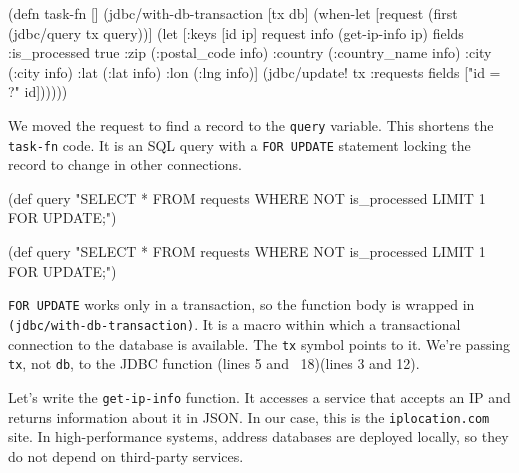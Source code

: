 \else

\begin{english}
  \begin{clojure/lines}
(defn task-fn []
  (jdbc/with-db-transaction [tx db]
    (when-let [request (first (jdbc/query tx query))]
      (let [{:keys [id ip]} request
            info   (get-ip-info ip)
            fields {:is_processed true
                    :zip (:postal_code info)
                    :country (:country_name info)
                    :city (:city info)
                    :lat (:lat info)
                    :lon (:lng info)}]
        (jdbc/update! tx :requests
                      fields
                      ["id = ?" id])))))
  \end{clojure/lines}
\end{english}

\fi


We moved the request to find a record to the \verb|query| variable. This shortens the \verb|task-fn| code. It is an SQL query with a \verb|FOR UPDATE| statement locking the record to change in other connections.

\ifnarrow

\begin{english}
  \begin{clojure}
(def query
  "SELECT * FROM requests
   WHERE NOT is_processed
   LIMIT 1 FOR UPDATE;")
  \end{clojure}
\end{english}

\else

\begin{english}
  \begin{clojure}
(def query
  "SELECT * FROM requests WHERE NOT is_processed
   LIMIT 1 FOR UPDATE;")
  \end{clojure}
\end{english}

\fi

\verb|FOR UPDATE| works only in a transaction, so the function body is wrapped in \texttt{(jdbc/with\--db-transaction)}. It is a macro within which a transactional connection to the database is available. The \verb|tx| symbol points to it. We're passing \verb|tx|, not \verb|db|, to the JDBC function \ifnarrow(lines 5 and ~18)\else(lines 3 and 12)\fi.


Let's write the \verb|get-ip-info| function. It accesses a service that accepts an IP and returns information about it in JSON. In our case, this is the \verb|iplocation.com| site. In high-performance systems, address databases are deployed locally, so they do not depend on third-party services.

